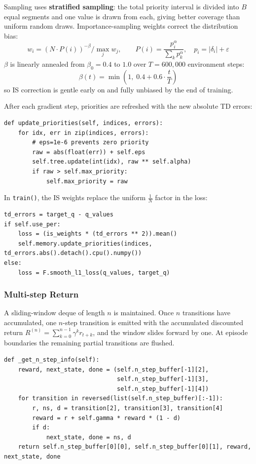 \documentclass[12pt, a4paper]{report}
\begin{document}
Sampling uses \textbf{stratified sampling}: the total priority interval is divided into $B$ equal
segments and one value is drawn from each, giving better coverage than uniform random draws.
Importance-sampling weights correct the distribution bias:
\[
  w_i = \left(N \cdot P(i)\right)^{-\beta} \Bigg/ \max_j w_j,
  \qquad P(i) = \frac{p_i^{\alpha}}{\sum_k p_k^{\alpha}}, \quad p_i = |\delta_i| + \varepsilon
\]
$\beta$ is linearly annealed from $\beta_0 = 0.4$ to $1.0$ over $T = 600{,}000$ environment steps:
\[
  \beta(t) = \min\!\left(1,\; 0.4 + 0.6 \cdot \frac{t}{T}\right)
\]
so IS correction is gentle early on and fully unbiased by the end of training.

After each gradient step, priorities are refreshed with the new absolute TD errors:

\begin{lstlisting}[caption={Priority update after each training step.}]
def update_priorities(self, indices, errors):
    for idx, err in zip(indices, errors):
        # eps=1e-6 prevents zero priority
        raw = abs(float(err)) + self.eps
        self.tree.update(int(idx), raw ** self.alpha)
        if raw > self.max_priority:
            self.max_priority = raw
\end{lstlisting}

In \texttt{train()}, the IS weights replace the uniform $\frac{1}{N}$ factor in the loss:

\begin{lstlisting}[caption={PER-weighted loss in train().}]
td_errors = target_q - q_values
if self.use_per:
    loss = (is_weights * (td_errors ** 2)).mean()
    self.memory.update_priorities(indices, td_errors.abs().detach().cpu().numpy())
else:
    loss = F.smooth_l1_loss(q_values, target_q)
\end{lstlisting}

\subsubsection*{Multi-step Return}

A sliding-window deque of length $n$ is maintained. Once $n$ transitions have accumulated, one
$n$-step transition is emitted with the accumulated discounted return
$R^{(n)} = \sum_{k=0}^{n-1} \gamma^k r_{t+k}$, and the window slides forward by one.
At episode boundaries the remaining partial transitions are flushed.

\begin{lstlisting}[caption={n-step return computation in \_get\_n\_step\_info().}]
def _get_n_step_info(self):
    reward, next_state, done = (self.n_step_buffer[-1][2],
                                self.n_step_buffer[-1][3],
                                self.n_step_buffer[-1][4])
    for transition in reversed(list(self.n_step_buffer)[:-1]):
        r, ns, d = transition[2], transition[3], transition[4]
        reward = r + self.gamma * reward * (1 - d)
        if d:
            next_state, done = ns, d
    return self.n_step_buffer[0][0], self.n_step_buffer[0][1], reward, next_state, done
\end{lstlisting}
\end{document}
